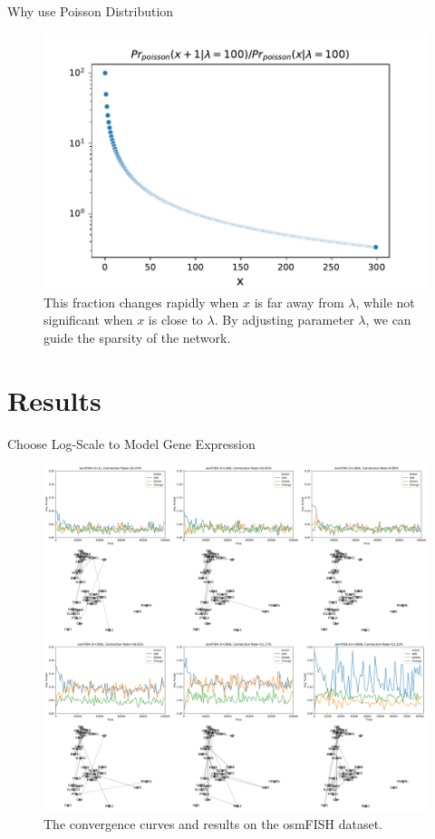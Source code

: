 \documentclass[handout,t]{beamer}
\begin{document}
\begin{frame}{Why use Poisson Distribution}
\begin{figure}
\vspace{-0.5cm}
\centering
\includegraphics[width=0.7\columnwidth]{../figure/whypoisson.pdf}
\caption{This fraction changes rapidly when $x$ is far away from $\lambda$, while not significant when $x$ is close to $\lambda$. By adjusting parameter $\lambda$, we can guide the sparsity of the network.}
\end{figure}
\end{frame}





\section{Results}

\begin{frame}{Choose Log-Scale to Model Gene Expression}
\begin{figure}
\vspace{-0.3cm}
\includegraphics[width=0.6\columnwidth]{../figure/convergence.png}
\caption{The convergence curves and results on the osmFISH dataset.}
\end{figure}
\end{frame}
\end{document}
